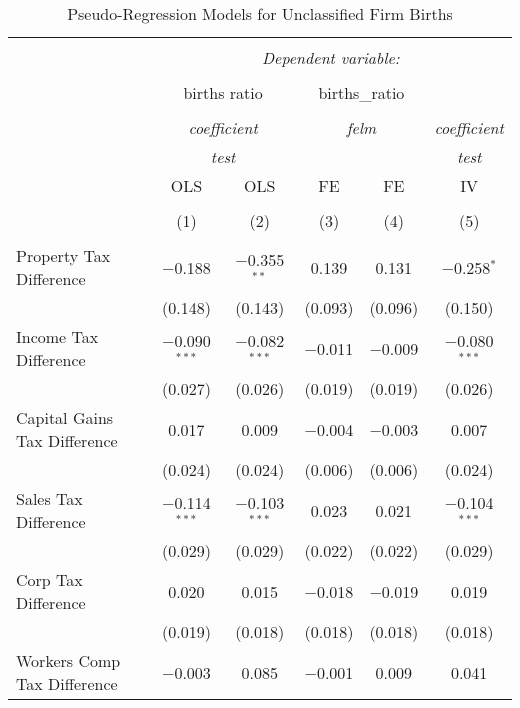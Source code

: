 
\begin{table}[!htbp] \centering 
  \caption{Pseudo-Regression Models for  Unclassified Firm Births} 
  \label{} 
\begin{tabular}{@{\extracolsep{5pt}}lccccc} 
\\[-1.8ex]\hline 
\hline \\[-1.8ex] 
 & \multicolumn{5}{c}{\textit{Dependent variable:}} \\ 
\cline{2-6} 
\\[-1.8ex] & \multicolumn{2}{c}{births ratio} & \multicolumn{2}{c}{births\_ratio} &   \\ 
\\[-1.8ex] & \multicolumn{2}{c}{\textit{coefficient}} & \multicolumn{2}{c}{\textit{felm}} & \textit{coefficient} \\ 
 & \multicolumn{2}{c}{\textit{test}} & \multicolumn{2}{c}{\textit{}} & \textit{test} \\ 
 & OLS & OLS & FE & FE & IV \\ 
\\[-1.8ex] & (1) & (2) & (3) & (4) & (5)\\ 
\hline \\[-1.8ex] 
 Property Tax Difference & $-$0.188 & $-$0.355$^{**}$ & 0.139 & 0.131 & $-$0.258$^{*}$ \\ 
  & (0.148) & (0.143) & (0.093) & (0.096) & (0.150) \\ 
  Income Tax Difference & $-$0.090$^{***}$ & $-$0.082$^{***}$ & $-$0.011 & $-$0.009 & $-$0.080$^{***}$ \\ 
  & (0.027) & (0.026) & (0.019) & (0.019) & (0.026) \\ 
  Capital Gains Tax Difference & 0.017 & 0.009 & $-$0.004 & $-$0.003 & 0.007 \\ 
  & (0.024) & (0.024) & (0.006) & (0.006) & (0.024) \\ 
  Sales Tax Difference & $-$0.114$^{***}$ & $-$0.103$^{***}$ & 0.023 & 0.021 & $-$0.104$^{***}$ \\ 
  & (0.029) & (0.029) & (0.022) & (0.022) & (0.029) \\ 
  Corp Tax Difference & 0.020 & 0.015 & $-$0.018 & $-$0.019 & 0.019 \\ 
  & (0.019) & (0.018) & (0.018) & (0.018) & (0.018) \\ 
  Workers Comp Tax Difference & $-$0.003 & 0.085 & $-$0.001 & 0.009 & 0.041 \\ 

\end{tabular}
\end{table}
